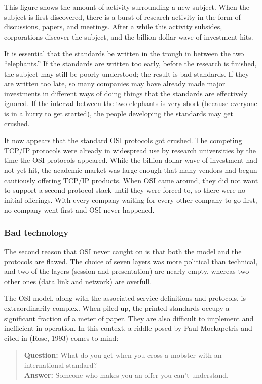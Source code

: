 This figure shows the amount of activity surrounding a new subject. When
the subject is first discovered, there is a burst of research activity
in the form of discussions, papers, and meetings. After a while this
activity subsides, corporations discover the subject, and the
billion-dollar wave of investment hits.

It is essential that the standards be written in the trough in between
the two ``elephants.''
If the standards are written too early, before
the research is finished, the subject may still be poorly understood;
the result is bad standards. If they are written too late, so many
companies may have already made major investments in different ways of
doing things that the standards are effectively ignored. If the interval
between the two elephants is very short (because everyone is in a hurry
to get started), the people developing the standards may get crushed.

It now appears that the standard OSI protocols got crushed. The
competing TCP/IP protocols were already in widespread use by research
universities by the time the OSI protocols appeared. While the
billion-dollar wave of investment had not yet hit, the academic market
was large enough that many vendors had begun cautiously offering TCP/IP
products. When OSI came around, they did not want to support a second
protocol stack until they were forced to, so there were no initial
offerings. With every company waiting for every other company to go
first, no company went first and OSI never happened.


\subsubsection{Bad technology}

The second reason that OSI never caught on is that both the model and
the protocols are flawed. The choice of seven layers was more political
than technical, and two of the layers (session and presentation) are
nearly empty, whereas two other ones (data link and network) are
overfull.

The OSI model, along with the associated service definitions and protocols, is extraordinarily complex.
When piled up, the printed standards occupy a significant fraction of a meter of paper.
They are also difficult to implement and inefficient in operation.
In this context, a riddle posed by Paul Mockapetris and cited in (Rose, 1993) comes to mind:

\begin{quote}
   \textbf{Question:}
   What do you get when you cross a mobster with an international standard?\\
   \textbf{Answer:}
   Someone who makes you an offer you can't understand.
\end{quote}

